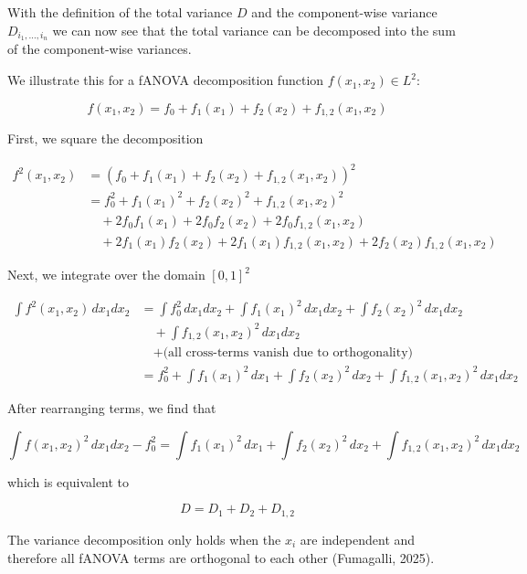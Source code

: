 With the definition of the total variance $D$ and the component-wise variance $D_{i_{1}, \dots, i_{n}}$ we can now see that the total variance can be decomposed into the sum of the component-wise variances.

We illustrate this for a fANOVA decomposition function \( f(x_1, x_2) \in L^2 \):

\[
f(x_1, x_2) = f_0 + f_1(x_1) + f_2(x_2) + f_{1,2}(x_1, x_2)
\]

\vspace{1em}

First, we square the decomposition

\begin{align*}
f^2(x_1, x_2) &= \left(f_0 + f_1(x_1) + f_2(x_2) + f_{1,2}(x_1, x_2)\right)^2 \\
&= f_0^2 + f_1(x_1)^2 + f_2(x_2)^2 + f_{1,2}(x_1, x_2)^2 \\
&\quad + 2f_0 f_1(x_1) + 2f_0 f_2(x_2) + 2f_0 f_{1,2}(x_1, x_2) \\
&\quad + 2f_1(x_1) f_2(x_2) + 2f_1(x_1) f_{1,2}(x_1, x_2) + 2f_2(x_2) f_{1,2}(x_1, x_2)
\end{align*}

\vspace{1em}

Next, we integrate over the domain \( [0,1]^2 \)

\begin{align*}
\int f^2(x_1, x_2) \, dx_1 dx_2 &= \int f_0^2 \, dx_1 dx_2 + \int f_1(x_1)^2 \, dx_1 dx_2 + \int f_2(x_2)^2 \, dx_1 dx_2 \\
&\quad + \int f_{1,2}(x_1, x_2)^2 \, dx_1 dx_2 \\
&\quad + \text{(all cross-terms vanish due to orthogonality)} \\
&= f_0^2 + \int f_1(x_1)^2 \, dx_1 + \int f_2(x_2)^2 \, dx_2 + \int f_{1,2}(x_1, x_2)^2 \, dx_1 dx_2
\end{align*}

\vspace{1em}

After rearranging terms, we find that

\[
\int f(x_1, x_2)^2 \, dx_1 dx_2 - f_0^2 = \int f_1(x_1)^2 \, dx_1 + \int f_2(x_2)^2 \, dx_2 + \int f_{1,2}(x_1, x_2)^2 \, dx_1 dx_2
\]

which is equivalent to 

\[
D = D_1 + D_2 + D_{1,2}
\]

The variance decomposition only holds when the $x_i$ are independent and therefore all fANOVA terms are orthogonal to each other (Fumagalli, 2025).

